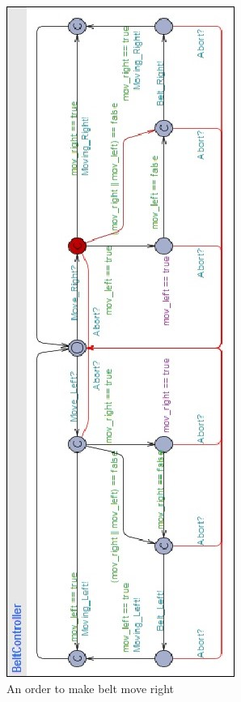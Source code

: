 \documentclass[a4paper,oneside,11pt]{report}
\begin{document}
\begin{figure}
\centering
\includegraphics[height=0.75\textheight]{images/BCTR1.jpg}
\caption{An order to make belt move right}
\label{fig:bctr1}
\end{figure}
\end{document}
